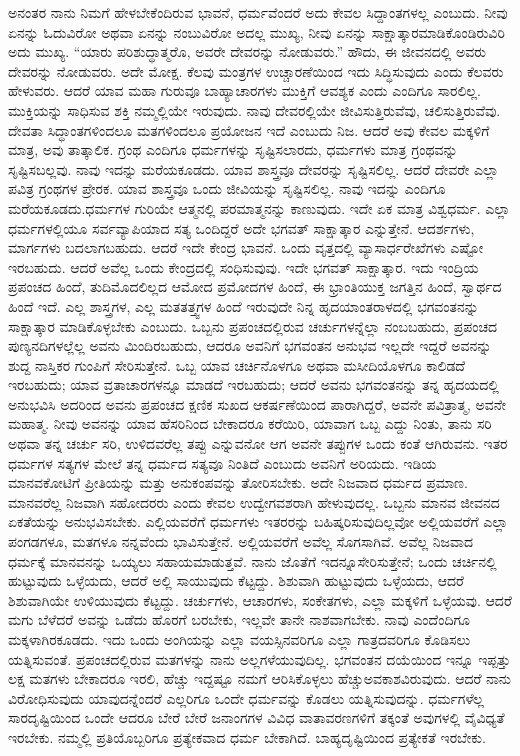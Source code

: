ಅನಂತರ ನಾನು ನಿಮಗೆ ಹೇಳಬೇಕೆಂದಿರುವ ಭಾವನೆ, ಧರ್ಮವೆಂದರೆ ಅದು ಕೇವಲ ಸಿದ್ದಾಂತಗಳಲ್ಲ ಎಂಬುದು. ನೀವು ಏನನ್ನು ಓದುವಿರೋ ಅಥವಾ ಏನನ್ನು ನಂಬುವಿರೋ ಅದಲ್ಲ ಮುಖ್ಯ, ನೀವು ಏನನ್ನು ಸಾಕ್ಷಾತ್ಕಾರಮಾಡಿಕೊಂಡಿರುವಿರಿ ಅದು ಮುಖ್ಯ. “ಯಾರು ಪರಿಶುದ್ಧಾತ್ಮರೊ, ಅವರೇ ದೇವರನ್ನು ನೋಡುವರು.” ಹೌದು, ಈ ಜೀವನದಲ್ಲಿ ಅವರು ದೇವರನ್ನು ನೋಡುವರು. ಅದೇ ಮೋಕ್ಷ. ಕೆಲವು ಮಂತ್ರಗಳ ಉಚ್ಚಾರಣೆಯಿಂದ ಇದು ಸಿದ್ಧಿಸುವುದು ಎಂದು ಕೆಲವರು ಹೇಳುವರು. ಆದರೆ ಯಾವ ಮಹಾ ಗುರುವೂ ಬಾಹ್ಯಾಚಾರಗಳು ಮುಕ್ತಿಗೆ ಆವಶ್ಯಕ ಎಂದು ಎಂದಿಗೂ ಸಾರಲಿಲ್ಲ. ಮುಕ್ತಿಯನ್ನು ಸಾಧಿಸುವ ಶಕ್ತಿ ನಮ್ಮಲ್ಲಿಯೇ ಇರುವುದು. ನಾವು ದೇವರಲ್ಲಿಯೇ ಜೀವಿಸುತ್ತಿರುವೆವು, ಚಲಿಸುತ್ತಿರುವೆವು. ದೇವತಾ ಸಿದ್ಧಾಂತಗಳಿಂದಲೂ ಮತಗಳಿಂದಲೂ ಪ್ರಯೋಜನ ಇದೆ ಎಂಬುದು ನಿಜ. ಆದರೆ ಅವು ಕೇವಲ ಮಕ್ಕಳಿಗೆ ಮಾತ್ರ, ಅವು ತಾತ್ಕಾಲಿಕ. ಗ್ರಂಥ ಎಂದಿಗೂ ಧರ್ಮಗಳನ್ನು ಸೃಷ್ಟಿಸಲಾರದು, ಧರ್ಮಗಳು ಮಾತ್ರ ಗ್ರಂಥವನ್ನು ಸೃಷ್ಟಿಸಬಲ್ಲವು. ನಾವು ಇದನ್ನು ಮರೆಯಕೂಡದು. ಯಾವ ಶಾಸ್ತ್ರವೂ ದೇವರನ್ನು ಸೃಷ್ಟಿಸಲಿಲ್ಲ. ಆದರೆ ದೇವರೇ ಎಲ್ಲಾ ಪವಿತ್ರ ಗ್ರಂಥಗಳ ಪ್ರೇರಕ. ಯಾವ ಶಾಸ್ತ್ರವೂ ಒಂದು ಜೀವಿಯನ್ನು ಸೃಷ್ಟಿಸಲಿಲ್ಲ. ನಾವು ಇದನ್ನು ಎಂದಿಗೂ ಮರೆಯಕೂಡದು.\break ಧರ್ಮಗಳ ಗುರಿಯೇ ಆತ್ಮನಲ್ಲಿ ಪರಮಾತ್ಮನನ್ನು ಕಾಣುವುದು. ಇದೇ ಏಕ ಮಾತ್ರ ವಿಶ್ವಧರ್ಮ. ಎಲ್ಲಾ ಧರ್ಮಗಳಲ್ಲಿಯೂ ಸರ್ವವ್ಯಾಪಿಯಾದ ಸತ್ಯ ಒಂದಿದ್ದರೆ ಅದೇ ಭಗವತ್ ಸಾಕ್ಷಾತ್ಕಾರ ಎನ್ನುತ್ತೇನೆ. ಆದರ್ಶಗಳು, ಮಾರ್ಗಗಳು ಬದಲಾಗಬಹುದು. ಆದರೆ ಇದೇ ಕೇಂದ್ರ ಭಾವನೆ. ಒಂದು ವೃತ್ತದಲ್ಲಿ ವ್ಯಾಸಾರ್ಧರೇಖೆಗಳು ಎಷ್ಟೋ ಇರಬಹುದು. ಆದರೆ ಅವೆಲ್ಲ ಒಂದು ಕೇಂದ್ರದಲ್ಲಿ ಸಂಧಿಸುವುವು. ಇದೇ ಭಗವತ್ ಸಾಕ್ಷಾತ್ಕಾರ. ಇದು ಇಂದ್ರಿಯ ಪ್ರಪಂಚದ ಹಿಂದೆ, ತುದಿಮೊದಲಿಲ್ಲದ ಆಮೋದ ಪ್ರಮೋದಗಳ ಹಿಂದೆ, ಈ ಭ್ರಾಂತಿಯುಕ್ತ ಜಗತ್ತಿನ ಹಿಂದೆ, ಸ್ವಾರ್ಥದ ಹಿಂದೆ ಇದೆ. ಎಲ್ಲ ಶಾಸ್ತ್ರಗಳ, ಎಲ್ಲ ಮತತತ್ತ್ವಗಳ ಹಿಂದೆ ಇರುವುದೇ ನಿನ್ನ ಹೃದಯಾಂತರಾಳದಲ್ಲಿ ಭಗವಂತನನ್ನು ಸಾಕ್ಷಾತ್ಕಾರ ಮಾಡಿಕೊಳ್ಳಬೇಕು ಎಂಬುದು. ಒಬ್ಬನು ಪ್ರಪಂಚದಲ್ಲಿರುವ ಚರ್ಚುಗಳನ್ನೆಲ್ಲಾ ನಂಬಬಹುದು, ಪ್ರಪಂಚದ ಪುಣ್ಯನದಿಗಳಲ್ಲೆಲ್ಲ ಅವನು ಮಿಂದಿರಬಹುದು, ಆದರೂ ಅವನಿಗೆ ಭಗವಂತನ ಅನುಭವ ಇಲ್ಲದೇ ಇದ್ದರೆ ಅವನನ್ನು ಶುದ್ದ ನಾಸ್ತಿಕರ ಗುಂಪಿಗೆ ಸೇರಿಸುತ್ತೇನೆ. ಒಬ್ಬ ಯಾವ ಚರ್ಚಿನೊಳಗೂ ಅಥವಾ ಮಸೀದಿಯೊಳಗೂ ಕಾಲಿಡದೆ ಇರಬಹುದು; ಯಾವ ವ್ರತಾಚಾರಗಳನ್ನೂ ಮಾಡದೆ ಇರಬಹುದು; ಆದರೆ ಅವನು ಭಗವಂತನನ್ನು ತನ್ನ ಹೃದಯದಲ್ಲಿ ಅನುಭವಿಸಿ ಅದರಿಂದ ಅವನು ಪ್ರಪಂಚದ ಕ್ಷಣಿಕ ಸುಖದ ಆಕರ್ಷಣೆಯಿಂದ ಪಾರಾಗಿದ್ದರೆ, ಅವನೇ ಪವಿತ್ರಾತ್ಮ, ಅವನೇ ಮಹಾತ್ಮ. ನೀವು ಅವನನ್ನು ಯಾವ ಹೆಸರಿನಿಂದ ಬೇಕಾದರೂ ಕರೆಯಿರಿ, ಯಾವಾಗ ಒಬ್ಬ ಎದ್ದು ನಿಂತು, ತಾನು ಸರಿ ಅಥವಾ ತನ್ನ ಚರ್ಚು ಸರಿ, ಉಳಿದವರೆಲ್ಲ ತಪ್ಪು ಎನ್ನುವನೋ ಆಗ ಅವನೇ ತಪ್ಪುಗಳ ಒಂದು ಕಂತೆ ಆಗಿರುವನು. ಇತರ ಧರ್ಮಗಳ ಸತ್ಯಗಳ ಮೇಲೆ ತನ್ನ ಧರ್ಮದ ಸತ್ಯವೂ ನಿಂತಿದೆ ಎಂಬುದು ಅವನಿಗೆ ಅರಿಯದು. ಇಡಿಯ ಮಾನವಕೋಟಿಗೆ ಪ್ರೀತಿಯನ್ನು ಮತ್ತು ಅನುಕಂಪವನ್ನು ತೋರಿಸಬೇಕು. ಅದೇ ನಿಜವಾದ ಧರ್ಮದ ಪ್ರಮಾಣ. ಮಾನವರೆಲ್ಲ ನಿಜವಾಗಿ ಸಹೋದರರು ಎಂದು ಕೇವಲ ಉದ್ವೇಗವಶರಾಗಿ ಹೇಳುವುದಲ್ಲ. ಒಬ್ಬನು ಮಾನವ ಜೀವನದ ಏಕತೆಯನ್ನು ಅನುಭವಿಸಬೇಕು. ಎಲ್ಲಿಯವರೆಗೆ ಧರ್ಮಗಳು ಇತರರನ್ನು ಬಹಿಷ್ಕರಿಸುವುದಿಲ್ಲವೋ ಅಲ್ಲಿಯವರೆಗೆ ಎಲ್ಲಾ ಪಂಗಡಗಳೂ, ಮತಗಳೂ ನನ್ನವೆಂದು ಭಾವಿಸುತ್ತೇನೆ. ಅಲ್ಲಿಯವರೆಗೆ ಅವೆಲ್ಲ ಸೊಗಸಾಗಿವೆ. ಅವೆಲ್ಲ ನಿಜವಾದ ಧರ್ಮಕ್ಕೆ ಮಾನವನನ್ನು ಒಯ್ಯಲು ಸಹಾಯಮಾಡುತ್ತವೆ. ನಾನು ಜೊತೆಗೆ ಇದನ್ನೂ\break ಸೇರಿಸುತ್ತೇನೆ; ಒಂದು ಚರ್ಚಿನಲ್ಲಿ ಹುಟ್ಟುವುದು ಒಳ್ಳೆಯದು, ಆದರೆ ಅಲ್ಲಿ ಸಾಯುವುದು ಕೆಟ್ಟದ್ದು. ಶಿಶುವಾಗಿ ಹುಟ್ಟುವುದು ಒಳ್ಳೆಯದು, ಆದರೆ ಶಿಶುವಾಗಿಯೇ ಉಳಿಯುವುದು ಕೆಟ್ಟದ್ದು. ಚರ್ಚುಗಳು, ಆಚಾರಗಳು, ಸಂಕೇತಗಳು, ಎಲ್ಲಾ ಮಕ್ಕಳಿಗೆ ಒಳ್ಳೆಯವು. ಆದರೆ ಮಗು ಬೆಳೆದರೆ ಅವನ್ನು ಒಡೆದು ಹೊರಗೆ ಬರಬೇಕು, ಇಲ್ಲವೇ ತಾನೇ ನಾಶವಾಗಬೇಕು. ನಾವು ಎಂದೆಂದಿಗೂ ಮಕ್ಕಳಾಗಿರಕೂಡದು. ಇದು ಒಂದು ಅಂಗಿಯನ್ನು ಎಲ್ಲಾ ವಯಸ್ಸಿನವರಿಗೂ ಎಲ್ಲಾ ಗಾತ್ರದವರಿಗೂ ಕೊಡಿಸಲು ಯತ್ನಿಸುವಂತೆ. ಪ್ರಪಂಚದಲ್ಲಿರುವ ಮತಗಳನ್ನು ನಾನು ಅಲ್ಲಗಳೆಯುವುದಿಲ್ಲ. ಭಗವಂತನ ದಯೆಯಿಂದ ಇನ್ನೂ ಇಪ್ಪತ್ತು ಲಕ್ಷ ಮತಗಳು ಬೇಕಾದರೂ ಇರಲಿ, ಹೆಚ್ಚು ಇದ್ದಷ್ಟೂ ನಮಗೆ ಆರಿಸಿಕೊಳ್ಳಲು ಹೆಚ್ಚು\break ಅವಕಾಶವಿರುವುದು. ಆದರೆ ನಾನು ವಿರೋಧಿಸುವುದು ಯಾವುದನ್ನೆಂದರೆ ಎಲ್ಲರಿಗೂ ಒಂದೇ ಧರ್ಮವನ್ನು ಕೊಡಲು ಯತ್ನಿಸುವುದನ್ನು. ಧರ್ಮಗಳೆಲ್ಲ ಸಾರದೃಷ್ಟಿಯಿಂದ ಒಂದೇ ಆದರೂ ಬೇರೆ ಬೇರೆ ಜನಾಂಗಗಳ ವಿವಿಧ ವಾತಾವರಣಗಳಿಗೆ ತಕ್ಕಂತೆ ಅವುಗಳಲ್ಲಿ ವೈವಿಧ್ಯತೆ ಇರಬೇಕು. ನಮ್ಮಲ್ಲಿ ಪ್ರತಿಯೊಬ್ಬರಿಗೂ ಪ್ರತ್ಯೇಕವಾದ ಧರ್ಮ ಬೇಕಾಗಿದೆ. ಬಾಹ್ಯದೃಷ್ಟಿಯಿಂದ ಪ್ರತ್ಯೇಕತೆ ಇರಬೇಕು.

